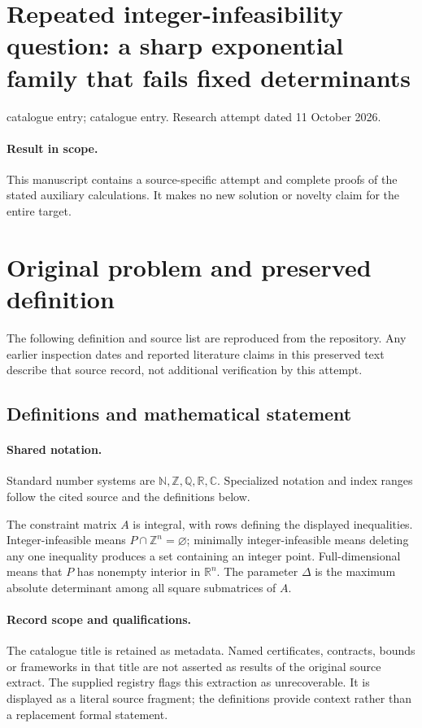 \documentclass[11pt]{article}
\begin{document}
\section*{Repeated integer-infeasibility question: a sharp exponential family that fails fixed determinants}
\noindent catalogue entry; catalogue entry. Research attempt dated 11 October 2026.
\paragraph{Result in scope.}This manuscript contains a source-specific attempt and complete proofs of the stated auxiliary calculations. It makes no new solution or novelty claim for the entire target.
\section{Original problem and preserved definition}
The following definition and source list are reproduced from the repository. Any earlier inspection dates and reported literature claims in this preserved text describe that source record, not additional verification by this attempt.
\subsection{Definitions and mathematical statement}

\paragraph{Shared notation.}Standard number systems are $\mathbb N,\mathbb Z,\mathbb Q,\mathbb R,\mathbb C$. Specialized notation and index ranges follow the cited source and the definitions below.


The constraint matrix $A$ is integral, with rows defining the displayed inequalities. Integer-infeasible means $P\cap\mathbb Z^n=\varnothing$; minimally integer-infeasible means deleting any one inequality produces a set containing an integer point. Full-dimensional means that $P$ has nonempty interior in $\mathbb R^n$. The parameter $\Delta$ is the maximum absolute determinant among all square submatrices of $A$.
\paragraph{Record scope and qualifications.}
The catalogue title is retained as metadata. Named certificates, contracts, bounds or frameworks in that title are not asserted as results of the original source extract.
The supplied registry flags this extraction as unrecoverable. It is displayed as a literal source fragment; the definitions provide context rather than a replacement formal statement.
\end{document}
